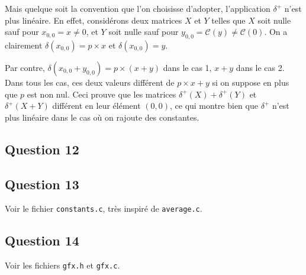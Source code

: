 \documentclass{article}
\begin{document}
Mais quelque soit la convention que l'on choisisse d'adopter, l'application $\delta^+$ n'est plus linéaire. En effet, considérons deux matrices $X$ et $Y$ telles que $X$ soit nulle sauf pour $x_{0,0} = x \neq 0$, et $Y$ soit nulle sauf pour $y_{0,0} = \mathcal{C}(y) \neq \mathcal{C}(0)$.
On a clairement $\delta(x_{0,0}) = p \times x$ et $\delta(x_{0,0}) = y$.

Par contre, $\delta(x_{0,0} + y_{0,0}) = p \times (x+y)$ dans le cas 1, $x+y$ dans le cas 2. Dans tous les cas, ces deux valeurs différent de $p \times x + y$ si on suppose en plus que $p$ est non nul. Ceci prouve que les matrices $\delta^+(X) + \delta^+(Y)$ et $\delta^+(X+Y)$ différent en leur élément $(0,0)$, ce qui montre bien que $\delta^+$ n'est plus linéaire dans le cas où on rajoute des constantes.

\subsection*{Question 12}


\subsection*{Question 13}

Voir le fichier \texttt{constants.c}, très inspiré de \texttt{average.c}.

\subsection*{Question 14}

Voir les fichiers \texttt{gfx.h} et \texttt{gfx.c}.
\end{document}
